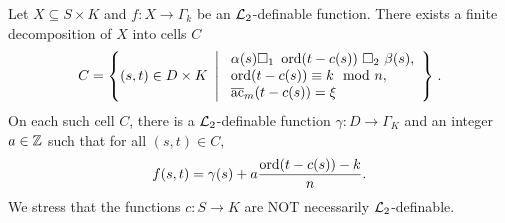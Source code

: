 \begin{thm} 
\label{thm:partialprep} 
Let $X \subseteq S \times K$ and $f:X\rightarrow \Gamma_k$ be an $\mathcal{L}_2$-definable function. There exists a finite decomposition of $X$ into cells $C$ 
\[C = \left\{(s,t) \in D\times K \ \left| \ \begin{array}{l} \alpha(s) \square_1 \ \ord(t-c(s)) \ \square_2 \ \beta(s),\\ \ord(t-c(s)) \equiv k\mod n,\\ \ac_{m}(t-c(s)) = \xi \end{array} \right\}\right..\]
On each such cell $C$, there is a $\mathcal{L}_2$-definable function $\gamma:D\to\Gamma_K$ and an integer $a\in {\mathbb Z}$ such that for all $(s,t) \in C$, 
\[f(s,t) = \gamma(s) + a\frac{\operatorname{ord}(t-c(s))-k}{n}.\]
We stress that the functions $c: S\to K$ are NOT necessarily $\mathcal{L}_2$-definable.
\end{thm}
